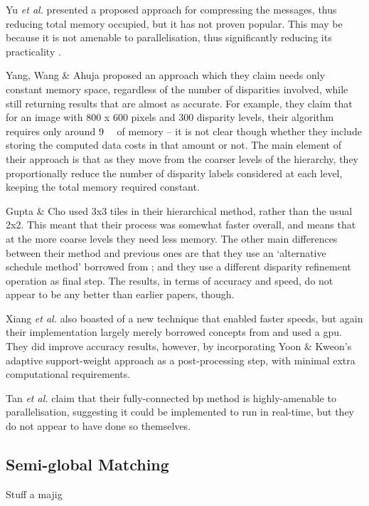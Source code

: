 Yu \textit{et al.} \cite{Yu2007} presented a proposed approach for compressing the messages, thus reducing total memory occupied, but it has not proven popular.  This may be because it is not amenable to parallelisation, thus significantly reducing its practicality \cite{Yang2010}.

Yang, Wang \& Ahuja \cite{Yang2010} proposed an approach which they claim needs only constant memory space, regardless of the number of disparities involved, while still returning results that are almost as accurate.  For example, they claim that for an image with 800 x 600 pixels and 300 disparity levels, their algorithm requires only around \SI{9}{\mebi\byte} of memory -- it is not clear though whether they include storing the computed data costs in that amount or not.  The main element of their approach is that as they move from the coarser levels of the hierarchy, they proportionally reduce the number of disparity labels considered at each level, keeping the total memory required constant.  %

Gupta \& Cho \cite{Gupta2012} used 3x3 tiles in their hierarchical method, rather than the usual 2x2.  This meant that their process was somewhat faster overall, and means that at the more coarse levels they need less memory.  The other main differences between their method and previous ones are that they use an `alternative schedule method' borrowed from \cite{Tappen2003}; and they use a different disparity refinement operation as final step.  The results, in terms of accuracy and speed, do not appear to be any better than earlier papers, though.

Xiang \textit{et al.} \cite{Xiang2012} also boasted of a new technique that enabled faster speeds, but again their implementation largely merely borrowed concepts from \cite{Felzenszwalb2006} and used a \gls{gpu}.  They did improve accuracy results, however, by incorporating Yoon \& Kweon's \cite{Yoon2005} adaptive support-weight approach as a post-processing step, with minimal extra computational requirements.

Tan \textit{et al.} \cite{Tan2017} claim that their fully-connected \gls{bp} method is highly-amenable to parallelisation, suggesting it could be implemented to run in real-time, but they do not appear to have done so themselves.

\subsection{Semi-global Matching}
Stuff a majig

